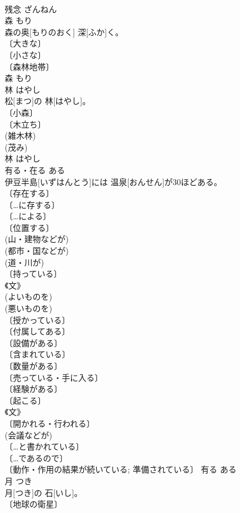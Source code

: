 \documentclass[8pt]{extreport}
\begin{document}
\begin{CJK}{UTF8}{min}
\\	残念	ざんねん	
\\	森	もり	
\\	森の奥[もりのおく] 深[ふか]く。	
\\	〔大きな〕 
\\	〔小さな〕 
\\	〔森林地帯〕 
\\	森	もり	
\\	林	はやし	
\\	松[まつ]の 林[はやし]。	
\\	〔小森〕 
\\	〔木立ち〕 
\\	(雑木林) 
\\	(茂み) 
\\	林	はやし	
\\	有る・在る	ある	
\\	伊豆半島[いずはんとう]には 温泉[おんせん]が30ほどある。	
\\	〔存在する〕 
\\	〔…に存する〕 
\\	〔…による〕 
\\	〔位置する〕 
\\	(山・建物などが) 
\\	(都市・国などが) 
\\	(道・川が) 
\\	〔持っている〕 
\\	《文》 
\\	(よいものを) 
\\	(悪いものを) 
\\	〔授かっている〕 
\\	〔付属してある〕 
\\	〔設備がある〕 
\\	〔含まれている〕 
\\	〔数量がある〕 
\\	〔売っている・手に入る〕 
\\	〔経験がある〕 
\\	〔起こる〕 
\\	《文》 
\\	〔開かれる・行われる〕 
\\	(会議などが) 
\\	〔…と書かれている〕 
\\	〔…であるので〕 
\\	〔動作・作用の結果が続いている; 準備されている〕	有る	ある	
\\	月	つき	
\\	月[つき]の 石[いし]。	
\\	〔地球の衛星〕 

\end{CJK}
\end{document}

